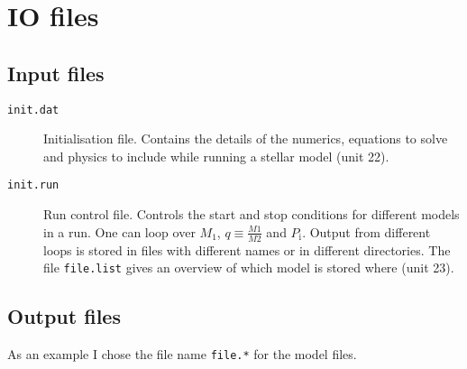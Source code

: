 \section{IO files}

\subsection{Input files}

\begin{description}
\item[\texttt{init.dat}] Initialisation file. Contains the details of the numerics, equations to solve and physics to include while running a stellar model (unit 22).
\item[\texttt{init.run}] Run control file. Controls the start and stop conditions for different models in a run. One can loop over $M_1$, $q \equiv \frac{M1}{M2}$ and $P_\mathrm{i}$.  Output
from different loops is stored in files with different names or in different directories.  The file \texttt{file.list} gives an overview of which model is stored where (unit 23).
\end{description}


\subsection{Output files}
As an example I chose the file name \texttt{file.*} for the model files.

